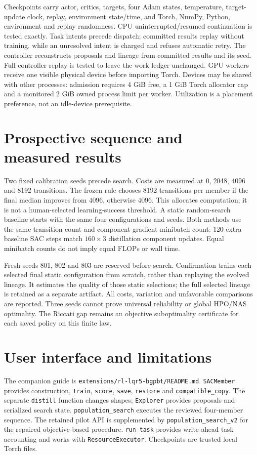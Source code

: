 Checkpoints carry actor, critics, targets, four Adam states, temperature,
target-update clock, replay, environment state/time, and Torch, NumPy, Python,
environment and replay randomness. CPU uninterrupted/resumed continuation is
tested exactly. Task intents precede dispatch; committed results replay without
training, while an unresolved intent is charged and refuses automatic retry.
The controller reconstructs proposals and lineage from committed results and
its seed. Full controller replay is tested to leave the work ledger unchanged.
GPU workers receive one visible physical device before importing Torch. Devices
may be shared with other processes: admission requires 4 GiB free, a 1 GiB
Torch allocator cap and a monitored 2 GiB owned process limit per worker.
Utilization is a placement preference, not an idle-device prerequisite.

\section{Prospective sequence and measured results}
Two fixed calibration seeds precede search. Costs are measured at 0, 2048,
4096 and 8192 transitions. The frozen rule chooses 8192 transitions per member
if the final median improves from 4096, otherwise 4096. This allocates computation;
it is not a human-selected learning-success threshold. A static random-search
baseline starts with the same four configurations and seeds. Both methods use
the same transition count and component-gradient minibatch count: 120 extra
baseline SAC steps match $160\times3$ distillation component updates. Equal
minibatch counts do not imply equal FLOPs or wall time.

Fresh seeds 801, 802 and 803 are reserved before search. Confirmation trains
each selected final static configuration from scratch, rather than replaying
the evolved lineage. It estimates the quality of those static selections;
the full selected lineage is retained as a separate artifact. All costs,
variation and unfavorable comparisons are reported. Three seeds cannot prove
universal reliability or global HPO/NAS optimality. The Riccati gap remains an
objective suboptimality certificate for each saved policy on this finite law.



\section{User interface and limitations}
The companion guide is
\texttt{extensions/rl-lqr5-bgpbt/README.md}.
\texttt{SACMember} provides construction, \texttt{train}, \texttt{score},
\texttt{save}, \texttt{restore} and \texttt{compatible\_copy}.
The separate \texttt{distill} function changes shapes;
\texttt{Explorer} provides proposals and serialized search state.
\texttt{population\_search} executes the reviewed four-member sequence.
The retained pilot API is supplemented by \texttt{population\_search\_v2}
for the repaired objective-based procedure.
\texttt{run\_task} provides write-ahead task accounting and works with
\texttt{ResourceExecutor}. Checkpoints are trusted local Torch files.

